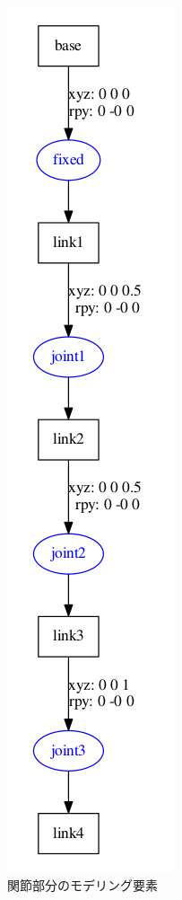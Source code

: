 \begin{figure}[ht]
  \centering
  \includegraphics[width=0.5\columnwidth]{pictures/chapter11/pic_11_05.png}
  \caption{関節部分のモデリング要素}
\end{figure}


